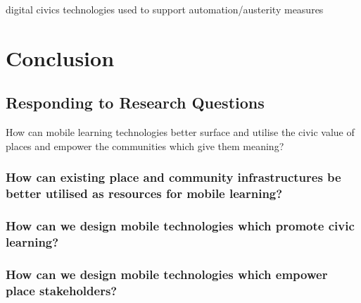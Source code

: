 digital civics technologies used to support automation/austerity measures

\section{Conclusion}

\subsection{Responding to Research Questions}

How can mobile learning technologies better surface and utilise the civic value of places and empower the communities which give them meaning?

\subsubsection{How can existing place and community infrastructures be better utilised as resources for mobile learning?}

\subsubsection{How can we design mobile technologies which promote civic learning?}

\subsubsection{How can we design mobile technologies which empower place stakeholders?}
